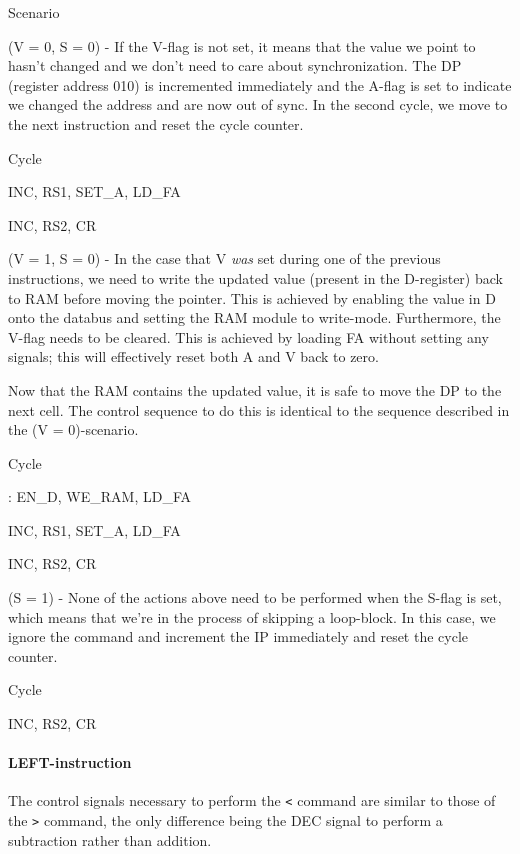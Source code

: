 \begin{labeledenum}{Scenario}
\item (V = 0, S = 0) - If the V-flag is not set, it means that the value we point to hasn't changed and we don't need to care about synchronization. The DP (register address 010) is incremented immediately and the A-flag is set to indicate we changed the address and are now out of sync. In the second cycle, we move to the next instruction and reset the cycle counter.

  \begin{labeledenum}{Cycle}
  \item INC, RS1, SET\_A, LD\_FA
  \item INC, RS2, CR
  \end{labeledenum}
  
\item (V = 1, S = 0) - In the case that V \emph{was} set during one of the previous instructions, we need to write the updated value (present in the D-register) back to RAM before moving the pointer. This is achieved by enabling the value in D onto the databus and setting the RAM module to write-mode. Furthermore, the V-flag needs to be cleared. This is achieved by loading FA without setting any signals; this will effectively reset both A and V back to zero.

  Now that the RAM contains the updated value, it is safe to move the DP to the next cell. The control sequence to do this is identical to the sequence described in the (V = 0)-scenario.

  \begin{labeledenum}{Cycle}
  \item : EN\_D, WE\_RAM, LD\_FA
  \item INC, RS1, SET\_A, LD\_FA
  \item INC, RS2, CR
  \end{labeledenum}
  
\item (S = 1) - None of the actions above need to be performed when the S-flag is set, which means that we're in the process of skipping a loop-block. In this case, we ignore the command and increment the IP immediately and reset the cycle counter.
  \begin{labeledenum}{Cycle}
  \item INC, RS2, CR
  \end{labeledenum}

\end{labeledenum}

\paragraph{LEFT-instruction} The control signals necessary to perform the \texttt{<} command are similar to those of the \texttt{>} command, the only difference being the DEC signal to perform a subtraction rather than addition.


